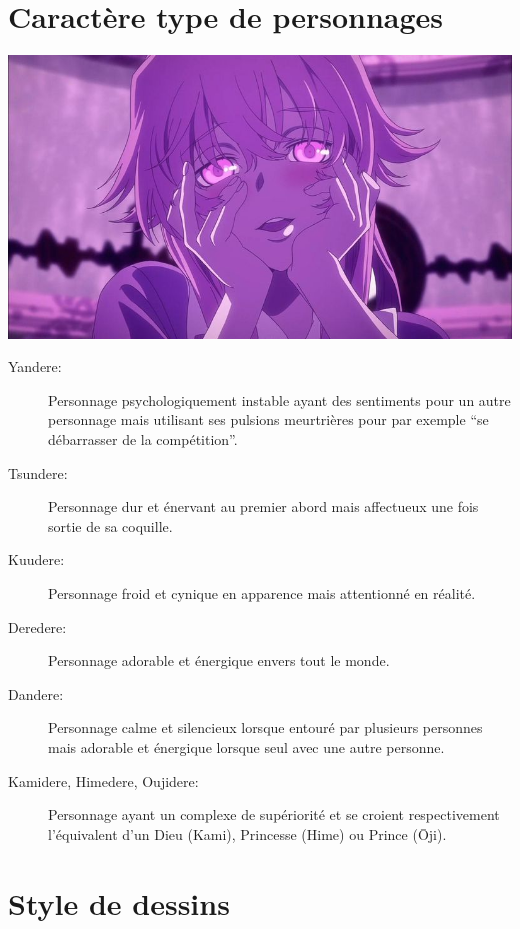 \section{Caractère type de personnages}

\begin{center}
	\includegraphics[scale=0.5]{Yandere.jpg}
\end{center}

\begin{description}
	\item[Yandere:] Personnage psychologiquement instable ayant des
		sentiments pour un autre personnage mais utilisant ses pulsions
		meurtrières pour par exemple ``se débarrasser de la compétition''.
	\item[Tsundere:] Personnage dur et énervant au premier abord mais
		affectueux une fois sortie de sa coquille.
	\item[Kuudere:] Personnage froid et cynique en apparence mais attentionné
		en réalité.
	\item[Deredere:] Personnage adorable et énergique envers tout le monde.
	\item[Dandere:] Personnage calme et silencieux lorsque entouré par
		plusieurs personnes mais adorable et énergique lorsque seul avec une
		autre personne.
	\item[Kamidere, Himedere, Oujidere:] Personnage ayant un complexe
		de supériorité et se croient respectivement l'équivalent d'un
		Dieu (Kami), Princesse (Hime) ou Prince (\=Oji).
\end{description}

\section{Style de dessins}

